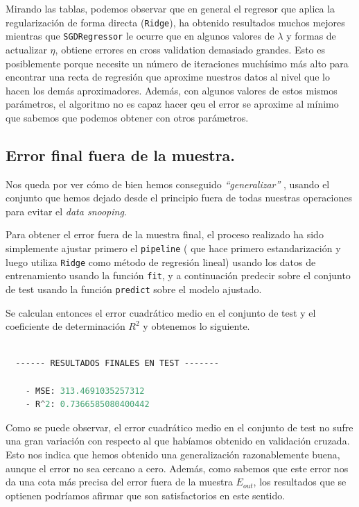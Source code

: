\documentclass[a4paper, 20pt]{article}
\begin{document}
Mirando las tablas, podemos observar que en general el regresor que aplica la regularización de forma directa (\lstinline{Ridge}), ha obtenido resultados muchos mejores mientras que \lstinline{SGDRegressor} le ocurre que en algunos valores de $\lambda$ y formas de actualizar $\eta$, obtiene errores en cross validation demasiado grandes. Esto es posiblemente porque necesite un número de iteraciones muchísimo más alto para encontrar una recta de regresión que aproxime nuestros datos al nivel que lo hacen los demás aproximadores. Además, con algunos valores de estos mismos parámetros, el algoritmo no es capaz hacer qeu el error se aproxime al mínimo que sabemos que podemos obtener con otros parámetros.

\subsection{Error final fuera de la muestra.}

Nos queda por ver cómo de bien hemos conseguido \emph{``generalizar''} , usando el conjunto que hemos dejado desde el principio fuera de todas nuestras operaciones para evitar el \emph{data snooping}.

Para obtener el error fuera de la muestra final, el proceso realizado ha sido simplemente ajustar primero  el \lstinline{pipeline} ( que hace primero estandarización y luego utiliza \lstinline{Ridge} como método de regresión lineal) usando los datos de entrenamiento usando la función \lstinline{fit}, y a continuación predecir sobre el conjunto de test usando la función \lstinline{predict} sobre el modelo ajustado.

Se calculan entonces el error cuadrático medio en el conjunto de test y el coeficiente de determinación $R^2$ y obtenemos lo siguiente.

\begin{lstlisting}[language=Python]

  ------ RESULTADOS FINALES EN TEST -------

	- MSE: 313.4691035257312
	- R^2: 0.7366585080400442 

\end{lstlisting}


Como se puede observar, el error cuadrático medio en el conjunto de test no sufre una gran variación con respecto al que habíamos obtenido en validación cruzada. Esto nos indica que hemos obtenido una generalización razonablemente buena, aunque el error no sea cercano a cero. Además, como sabemos que este error nos da una cota más precisa del error fuera de la muestra $E_{out}$, los resultados que se optienen podríamos afirmar que son satisfactorios en este sentido.
\end{document}
